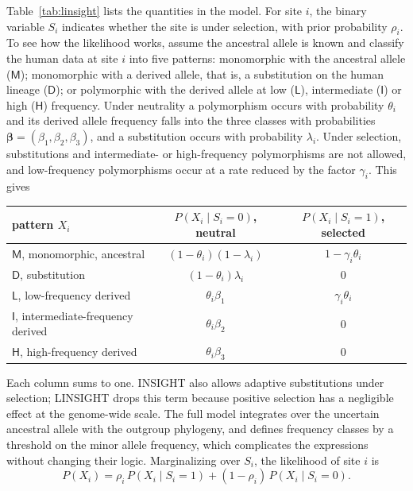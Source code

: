 Table~\ref{tab:linsight} lists the quantities in the model. For site $i$, the binary variable $S_i$ indicates whether the site is under selection, with prior probability $\rho_i$. To see how the likelihood works, assume the ancestral allele is known and classify the human data at site $i$ into five patterns: monomorphic with the ancestral allele ($\mathsf{M}$); monomorphic with a derived allele, that is, a substitution on the human lineage ($\mathsf{D}$); or polymorphic with the derived allele at low ($\mathsf{L}$), intermediate ($\mathsf{I}$) or high ($\mathsf{H}$) frequency. Under neutrality a polymorphism occurs with probability $\theta_i$ and its derived allele frequency falls into the three classes with probabilities $\boldsymbol\beta=(\beta_1,\beta_2,\beta_3)$, and a substitution occurs with probability $\lambda_i$. Under selection, substitutions and intermediate- or high-frequency polymorphisms are not allowed, and low-frequency polymorphisms occur at a rate reduced by the factor $\gamma_i$. This gives
\begin{center}
  \begin{tabular}{lcc}
    \toprule
    pattern $X_i$ & $P(X_i\mid S_i=0)$, neutral & $P(X_i\mid S_i=1)$, selected \\
    \midrule
    $\mathsf{M}$, monomorphic, ancestral & $(1-\theta_i)(1-\lambda_i)$ & $1-\gamma_i\theta_i$ \\
    $\mathsf{D}$, substitution & $(1-\theta_i)\lambda_i$ & $0$ \\
    $\mathsf{L}$, low-frequency derived & $\theta_i\beta_1$ & $\gamma_i\theta_i$ \\
    $\mathsf{I}$, intermediate-frequency derived & $\theta_i\beta_2$ & $0$ \\
    $\mathsf{H}$, high-frequency derived & $\theta_i\beta_3$ & $0$ \\
    \bottomrule
  \end{tabular}
\end{center}
Each column sums to one. INSIGHT also allows adaptive substitutions under selection; LINSIGHT drops this term because positive selection has a negligible effect at the genome-wide scale. The full model integrates over the uncertain ancestral allele with the outgroup phylogeny, and defines frequency classes by a threshold on the minor allele frequency, which complicates the expressions without changing their logic. Marginalizing over $S_i$, the likelihood of site $i$ is
\begin{equation}
  P(X_i) = \rho_i\,P(X_i\mid S_i=1) + (1-\rho_i)\,P(X_i\mid S_i=0) .
  \label{eq:linsight_lik}
\end{equation}

